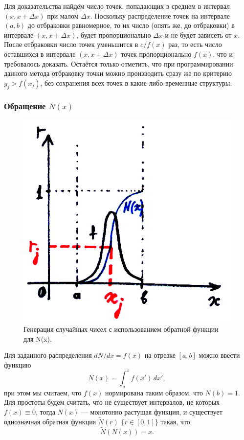 \documentclass{book}
\begin{document}
Для доказательства найдём число точек, попадающих в среднем в интервал $(x, x + \Delta x)$ при
малом $\Delta x$. Поскольку распределение точек на интервале $(a, b)$ до отбраковки равномерное, то
их число (опять же, до отбраковки) в интервале $(x, x + \Delta x)$, будет пропорционально $\Delta
x$ и не будет зависеть от $x$. После отбраковки число точек уменьшится в $c / f(x)$ раз, то есть
число оставшихся в интервале $(x, x + \Delta x)$ точек пропорционально $f(x)$, что и требовалось
доказать. Остаётся только отметить, что при программировании данного метода отбраковку точки можно
производить сразу же по критерию $y_j > f(x_j)$, без сохранения всех точек в какие-либо временные
структуры.

\subsubsection{Обращение $N(x)$}

\begin{figure}
	\includegraphics[width=0.6\linewidth]{inversion-of-N.png}
    \caption{\label{dots-for-monte-carlo}Генерация случайных чисел с использованием обратной
    функции для N(x).}
\end{figure}

Для заданного распределения $dN/dx = f(x)$ на отрезке $[a, b]$ можно ввести функцию
\begin{equation}
    N(x) = \int_a^x f(x') \, dx',
\end{equation}
при этом мы считаем, что $f(x)$ нормирована таким образом, что $N(b) = 1$. Для простоты будем
считать, что не существует интервалов, не которых $f(x) \equiv 0$, тогда $N(x)$ --- монотонно
растущая функция, и существует однозначная обратная функция $\tilde N(r)$ \{$r \in [0, 1]$\}
такая, что
\begin{equation}
    \label{tilde_N_N}
    \tilde N(N(x)) = x.
\end{equation}
\end{document}
